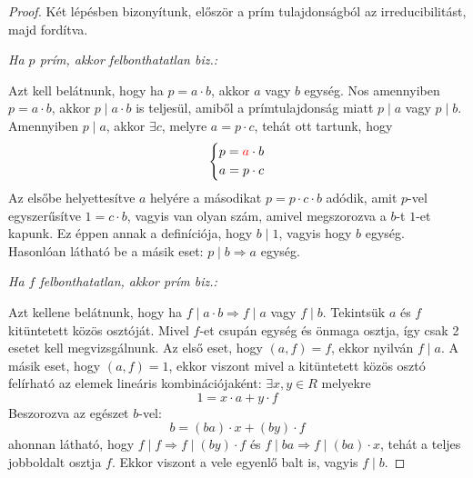 \documentclass[12pt]{book}
\theoremstyle{plain} %
\theoremstyle{definition} %
\theoremstyle{remark}
\numberwithin{equation}{section}  %
\begin{document}
	\begin{proof}
		Két lépésben bizonyítunk, először a prím tulajdonságból az irreducibilitást, majd fordítva.
		
		\textit{Ha $p$ prím, akkor felbonthatatlan biz.:}
		
		Azt kell belátnunk, hogy ha $p=a\cdot b$, akkor $a$ vagy $b$ egység. Nos amennyiben $p=a\cdot b$, akkor $p\mid a\cdot b$ is teljesül, amiből a prímtulajdonság miatt $p\mid a$ vagy $p\mid b$. Amennyiben $p\mid a$, akkor $\exists c$, melyre $a = p\cdot c$, tehát ott tartunk, hogy
		\[
		\begin{cases*}
			p = \color{red}a\color{black}\cdot b \\
			a = p\cdot c 
		\end{cases*}
		\]
		Az elsőbe helyettesítve $a$ helyére a másodikat $p= p\cdot c\cdot b$ adódik,  amit $p$-vel egyszerűsítve $1 = c\cdot b$, vagyis van olyan szám, amivel megszorozva a $b$-t $1$-et kapunk. Ez éppen annak a definíciója, hogy $b\mid 1$, vagyis hogy $b$ egység. Hasonlóan látható be a másik eset: $p\mid b \Rightarrow a$ egység.
		
		\textit{Ha $f$ felbonthatatlan, akkor prím biz.:}
		
		Azt kellene belátnunk, hogy ha $f\mid a\cdot b \Rightarrow f\mid a$ vagy $f\mid b$. Tekintsük $a$ és $f$ kitüntetett közös osztóját. Mivel $f$-et csupán egység és önmaga osztja, így csak 2 esetet kell megvizsgálnunk. Az első eset, hogy $(a,f)=f$, ekkor nyilván $f\mid a$. A másik eset, hogy $(a,f)=1$, ekkor viszont mivel a kitüntetett közös osztó felírható az elemek lineáris kombinációjaként: $\exists x,y\in R$ melyekre
		\[ 1 = x\cdot a + y\cdot f  \]
		Beszorozva az egészet $b$-vel:
		\[ b = (ba)\cdot x + (by)\cdot f \]
		ahonnan látható, hogy $f\mid f \Rightarrow f\mid (by)\cdot f$ és $f\mid ba \Rightarrow f\mid (ba)\cdot x $, tehát a teljes jobboldalt osztja $f$. Ekkor viszont a vele egyenlő balt is, vagyis $f\mid b$.
	\end{proof}
	
\end{document}
